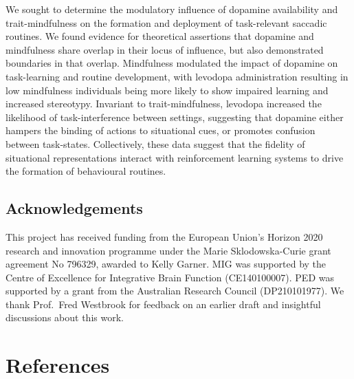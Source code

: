 \documentclass{article}
\begin{document}
We sought to determine the modulatory influence of dopamine availability
and trait-mindfulness on the formation and deployment of task-relevant
saccadic routines. We found evidence for theoretical assertions that
dopamine and mindfulness share overlap in their locus of influence, but
also demonstrated boundaries in that overlap. Mindfulness modulated the
impact of dopamine on task-learning and routine development, with
levodopa administration resulting in low mindfulness individuals being
more likely to show impaired learning and increased stereotypy.
Invariant to trait-mindfulness, levodopa increased the likelihood of
task-interference between settings, suggesting that dopamine either
hampers the binding of actions to situational cues, or promotes
confusion between task-states. Collectively, these data suggest that the
fidelity of situational representations interact with reinforcement
learning systems to drive the formation of behavioural routines.

\hypertarget{acknowledgements}{%
\subsection{Acknowledgements}\label{acknowledgements}}

This project has received funding from the European Union's Horizon 2020
research and innovation programme under the Marie Sklodowska-Curie grant
agreement No 796329, awarded to Kelly Garner. MIG was supported by the
Centre of Excellence for Integrative Brain Function (CE140100007). PED
was supported by a grant from the Australian Research Council
(DP210101977). We thank Prof.~Fred Westbrook for feedback on an earlier
draft and insightful discussions about this work.

\hypertarget{references}{%
\section*{References}\label{references}}
\end{document}
